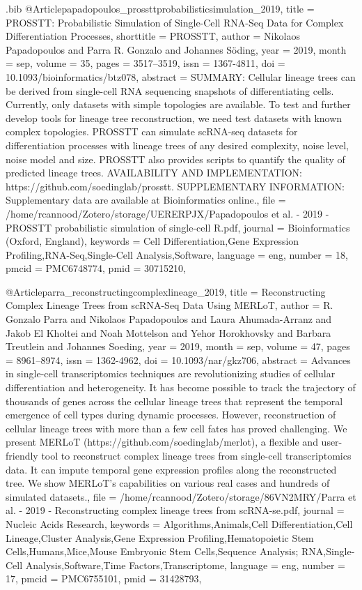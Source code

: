 \documentclass[
  table,
  10pt,
  a4paper]{article}
\begin{document}
\begin{filecontents}{\jobname.bib}
@Article{papadopoulos_prossttprobabilisticsimulation_2019,
	title = {{{PROSSTT}}: Probabilistic Simulation of Single-Cell {{RNA}}-Seq Data for Complex Differentiation Processes},
	shorttitle = {{{PROSSTT}}},
	author = {Nikolaos Papadopoulos and Parra R. Gonzalo and Johannes S{\"o}ding},
	year = {2019},
	month = {sep},
	volume = {35},
	pages = {3517--3519},
	issn = {1367-4811},
	doi = {10.1093/bioinformatics/btz078},
	abstract = {SUMMARY: Cellular lineage trees can be derived from single-cell RNA sequencing snapshots of differentiating cells. Currently, only datasets with simple topologies are available. To test and further develop tools for lineage tree reconstruction, we need test datasets with known complex topologies. PROSSTT can simulate scRNA-seq datasets for differentiation processes with lineage trees of any desired complexity, noise level, noise model and size. PROSSTT also provides scripts to quantify the quality of predicted lineage trees. AVAILABILITY AND IMPLEMENTATION: https://github.com/soedinglab/prosstt. SUPPLEMENTARY INFORMATION: Supplementary data are available at Bioinformatics online.},
	file = {/home/rcannood/Zotero/storage/UERERPJX/Papadopoulos et al. - 2019 - PROSSTT probabilistic simulation of single-cell R.pdf},
	journal = {Bioinformatics (Oxford, England)},
	keywords = {Cell Differentiation,Gene Expression Profiling,RNA-Seq,Single-Cell Analysis,Software},
	language = {eng},
	number = {18},
	pmcid = {PMC6748774},
	pmid = {30715210},
}

@Article{parra_reconstructingcomplexlineage_2019,
	title = {Reconstructing Complex Lineage Trees from {{scRNA}}-Seq Data Using {{MERLoT}}},
	author = {R. Gonzalo Parra and Nikolaos Papadopoulos and Laura Ahumada-Arranz and Jakob El Kholtei and Noah Mottelson and Yehor Horokhovsky and Barbara Treutlein and Johannes Soeding},
	year = {2019},
	month = {sep},
	volume = {47},
	pages = {8961--8974},
	issn = {1362-4962},
	doi = {10.1093/nar/gkz706},
	abstract = {Advances in single-cell transcriptomics techniques are revolutionizing studies of cellular differentiation and heterogeneity. It has become possible to track the trajectory of thousands of genes across the cellular lineage trees that represent the temporal emergence of cell types during dynamic processes. However, reconstruction of cellular lineage trees with more than a few cell fates has proved challenging. We present MERLoT (https://github.com/soedinglab/merlot), a flexible and user-friendly tool to reconstruct complex lineage trees from single-cell transcriptomics data. It can impute temporal gene expression profiles along the reconstructed tree. We show MERLoT's capabilities on various real cases and hundreds of simulated datasets.},
	file = {/home/rcannood/Zotero/storage/86VN2MRY/Parra et al. - 2019 - Reconstructing complex lineage trees from scRNA-se.pdf},
	journal = {Nucleic Acids Research},
	keywords = {Algorithms,Animals,Cell Differentiation,Cell Lineage,Cluster Analysis,Gene Expression Profiling,Hematopoietic Stem Cells,Humans,Mice,Mouse Embryonic Stem Cells,Sequence Analysis; RNA,Single-Cell Analysis,Software,Time Factors,Transcriptome},
	language = {eng},
	number = {17},
	pmcid = {PMC6755101},
	pmid = {31428793},
}


\end{filecontents}
\end{document}

